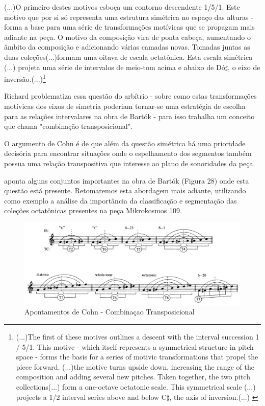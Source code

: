 \documentclass[
	12pt,				%
	openright,			%
	twoside,			%
	a4paper,			%
	english,			%
	french,				%
	spanish,			%
	brazil				%
	]{abntex2}
\begin{document}
\begin{citacao}
(...)O primeiro destes motivos esboça um contorno descendente 1/5/1. Este motivo que por si só representa uma estrutura simétrica no espaço das alturas - forma a base para uma série de transformações motívicas que se propagam mais adiante na peça.
O motivo da composição vira de ponta cabeça, aumentando o âmbito da composição e adicionando várias camadas novas. Tomadas juntas as duas coleções(...)formam uma oitava de escala octatônica. Esta escala simétrica (...) projeta uma série de intervalos de meio-tom acima e abaixo de Dó$\sharp$, o eixo de inversão.(...)\cite[p. 33]{pearsall2004symmetry}\footnote{(...)The first of these motives outlines a descent with the interval
succession 1 / 5/1. This motive - which itself represents a symmetrical structure in pitch space - forms the basis for a series of motivic transformations that propel the piece forward. (...)the motive turns
upside down, increasing the range of the composition and adding several new pitches. Taken together, the two pitch collections(...) form a one-octave octatonic scale. This symmetrical scale (...)
projects a 1/2 interval series above and below C$\sharp$, the axis of inversion.(...) \cite[p. 33]{pearsall2004symmetry}}
\end{citacao}

Richard  problematiza essa questão do arbítrio - sobre como estas transformações motívicas dos eixos de simetria poderiam tornar-se uma estratégia de escolha para as relações intervalares na obra de Bartók - para isso trabalha um conceito que chama "combinação transposicional". 

O argumento de Cohn é de que além da questão simétrica há uma prioridade decisória para encontrar situações onde o espelhamento dos segmentos também possua uma relação transpositiva que interesse ao plano de sonoridades da peça.

 aponta alguns conjuntos importantes na obra de Bartók (Figura 28) onde esta questão está presente. Retomaremos esta abordagem mais adiante, utilizando como exemplo a análise da importância da classificação e segmentação das coleções octatônicas presentes na peça Mikrokosmos 109.\cite{cohn1991bartok}

\begin{figure}[!h]
	\caption{\label{fig_grafico}Apontamentos de Cohn - Combinaçao Transposicional}
	\begin{center}
	    \includegraphics[scale=0.4]{axis/TCCohn.png}
	\end{center}
\end{figure}
\end{document}

